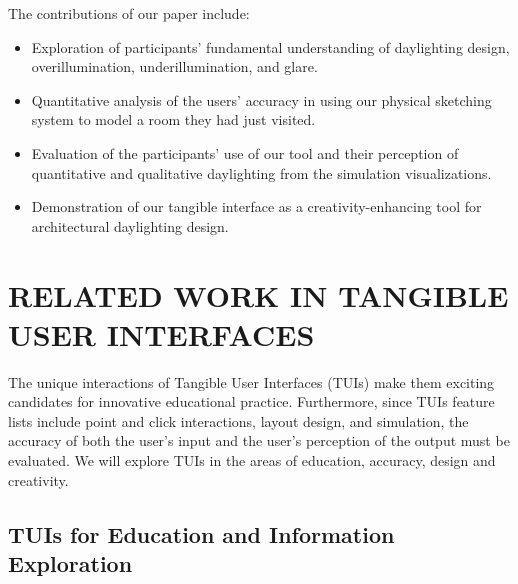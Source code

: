 \documentclass[preprint]{elsarticle}
\begin{document}
\noindent
The contributions of our paper include: %

\begin{itemize}



\item Exploration of participants' fundamental understanding of
  daylighting design, overillumination, underillumination, and glare.

\item Quantitative analysis of the users' accuracy in using our
  physical sketching system to model a room they had just visited.

\item Evaluation of the participants' use of our tool and their
  perception of quantitative and qualitative daylighting from the 
  simulation visualizations.

\item Demonstration of our tangible interface as a
  creativity-enhancing tool for architectural daylighting design.

\end{itemize}



\section{RELATED WORK IN TANGIBLE USER INTERFACES}




The unique interactions of Tangible User Interfaces (TUIs) make them
exciting candidates for innovative educational practice.  Furthermore,
since TUIs feature lists include point and click interactions, layout
design, and simulation, the accuracy of both the user's input and the
user's perception of the output must be evaluated.  We will explore TUIs
in the areas of education, accuracy, design and creativity.

\subsection{TUIs for Education and Information Exploration}
\end{document}
